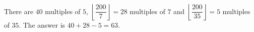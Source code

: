 There are $40$ multiples of $5$, $\left\lfloor\dfrac{200}{7}\right\rfloor=28$ multiples of $7$ and $\left\lfloor\dfrac{200}{35}\right\rfloor=5$ multiples of $35$. The answer is $40+28-5=\boxed{63}$.
